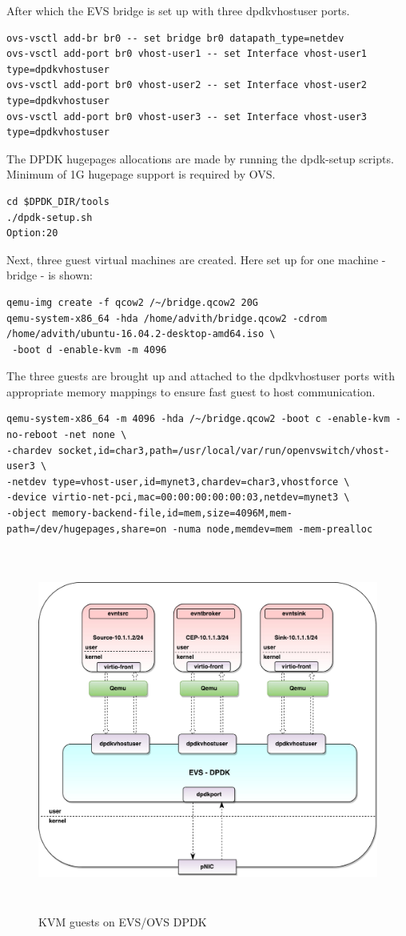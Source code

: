 After which the EVS bridge is set up with three dpdkvhostuser ports.
\begin{lstlisting}
ovs-vsctl add-br br0 -- set bridge br0 datapath_type=netdev
ovs-vsctl add-port br0 vhost-user1 -- set Interface vhost-user1 type=dpdkvhostuser
ovs-vsctl add-port br0 vhost-user2 -- set Interface vhost-user2 type=dpdkvhostuser 
ovs-vsctl add-port br0 vhost-user3 -- set Interface vhost-user3 type=dpdkvhostuser 
\end{lstlisting}

The DPDK hugepages allocations are made by running the dpdk-setup scripts. Minimum of 1G hugepage support is required by OVS.
\begin{lstlisting}
cd $DPDK_DIR/tools
./dpdk-setup.sh
Option:20
\end{lstlisting}

Next, three guest virtual machines are created. Here set up for one machine - bridge - is shown:
\begin{lstlisting}
qemu-img create -f qcow2 /~/bridge.qcow2 20G
qemu-system-x86_64 -hda /home/advith/bridge.qcow2 -cdrom /home/advith/ubuntu-16.04.2-desktop-amd64.iso \
 -boot d -enable-kvm -m 4096
\end{lstlisting}


The three guests are brought up and attached to the dpdkvhostuser ports with appropriate memory mappings to ensure fast guest to host communication.

\begin{lstlisting}
qemu-system-x86_64 -m 4096 -hda /~/bridge.qcow2 -boot c -enable-kvm -no-reboot -net none \
-chardev socket,id=char3,path=/usr/local/var/run/openvswitch/vhost-user3 \
-netdev type=vhost-user,id=mynet3,chardev=char3,vhostforce \
-device virtio-net-pci,mac=00:00:00:00:00:03,netdev=mynet3 \
-object memory-backend-file,id=mem,size=4096M,mem-path=/dev/hugepages,share=on -numa node,memdev=mem -mem-prealloc
\end{lstlisting}

 \begin{figure}[H]
	\centering
	\caption{KVM guests on EVS/OVS DPDK}
	\includegraphics[height=12cm]{evsdpdk04.pdf}
\end{figure}


